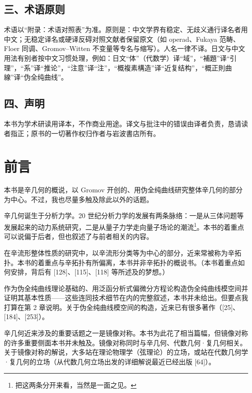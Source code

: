 \section*{三、术语原则}

术语以“附录：术语对照表”为准。原则是：中文学界有稳定、无歧义通行译名者用中文；无稳定译名或硬译反碍对照文献者保留原文（如 operad、Fukaya 范畴、Floer 同调、Gromov–Witten 不变量等专名与缩写）。人名一律不译。日文与中文用法有别者按中文习惯处理，例如：日文“体”（代数学）译“域”，“補題”译“引理”，“系”译“推论”，“注意”译“注”，“概複素構造”译“近复结构”，“概正則曲線”译“伪全纯曲线”。

\section*{四、声明}

本书为学术研读用译本，不作商业用途。译文与批注中的错误由译者负责，恳请读者指正；原书的一切著作权归作者与岩波書店所有。

\clearpage

\chapter*{前言}

本书是辛几何的概说，以 Gromov 开创的、用伪全纯曲线研究整体辛几何的部分为中心。不过，我也尽量多触及除此以外的话题。

辛几何诞生于分析力学。20 世纪分析力学的发展有两条脉络：一是从三体问题等发展起来的动力系统研究，二是从量子力学走向量子场论的潮流\footnote{把这两条分开来看，当然是一面之见。}。本书的着重点可以说偏于后者，但也叙述了与前者相关的内容。

在辛流形整体性质的研究中，以辛流形分类等为中心的部分，近来常被称为辛拓扑。本书的着重点与辛拓扑有所偏离，本书并非辛拓扑的概说书。（本书着重点如何安排，背后有 [128]、[115]、[118] 等所述及的梦想。）

作为伪全纯曲线理论基础的、用泛函分析式偏微分方程论构造伪全纯曲线模空间并证明其基本性质——这些连同技术细节在内的完整叙述，本书并未给出。但要点我打算在第 2 章说明。关于伪全纯曲线模空间的构造，近来已有很多著作（[25]、[184]、[253]）。

辛几何近来涉及的重要话题之一是镜像对称。本书为此花了相当篇幅，但镜像对称的许多重要侧面本书并未触及。镜像对称同时与辛几何、代数几何·复几何相关。关于镜像对称的解说，大多站在理论物理学（弦理论）的立场，或站在代数几何学·复几何的立场（从代数几何立场出发的详细解说最近已经出版 [64]）。

